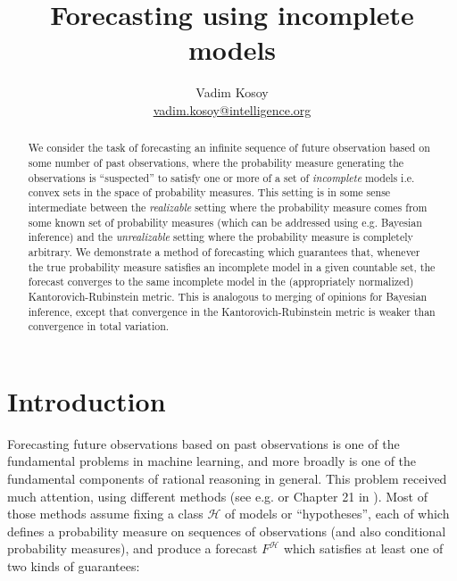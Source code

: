 \documentclass[11pt]{article}
\theoremstyle{definition}
\theoremstyle{plain}
\newcommand{\MC}{\mathcal{H}}
\begin{document}
\title{Forecasting using incomplete models}
\author{Vadim Kosoy \\ \href{mailto:vadim.kosoy@intelligence.org}{vadim.kosoy@intelligence.org}}
\date{}%
\maketitle

\begin{abstract}
We consider the task of forecasting an infinite sequence of future observation based on some number of past observations, where the probability measure generating the observations is \enquote{suspected} to satisfy one or more of a set of \emph{incomplete} models i.e. convex sets in the space of probability measures. This setting is in some sense intermediate between the \emph{realizable} setting where the probability measure comes from some known set of probability measures (which can be addressed using e.g. Bayesian inference) and the \emph{unrealizable} setting where the probability measure is completely arbitrary. We demonstrate a method of forecasting which guarantees that, whenever the true probability measure satisfies an incomplete model in a given countable set, the forecast converges to the same incomplete model in the (appropriately normalized) Kantorovich-Rubinstein metric. This is analogous to merging of opinions for Bayesian inference, except that convergence in the  Kantorovich-Rubinstein metric is weaker than convergence in total variation.
\end{abstract}


\section{Introduction}

Forecasting future observations based on past observations is one of the fundamental problems in machine learning, and more broadly is one of the fundamental components of rational reasoning in general. This problem received much attention, using different methods (see e.g. \cite{Cesa-Bianchi_2006} or Chapter 21 in \cite{Shalev-Shwartz_2014}). Most of those methods assume fixing a class $\MC$ of models or \enquote{hypotheses}, each of which defines a probability measure on sequences of observations (and also conditional probability measures), and produce a forecast $F^\MC$ which satisfies at least one of two kinds of guarantees:
\end{document}
